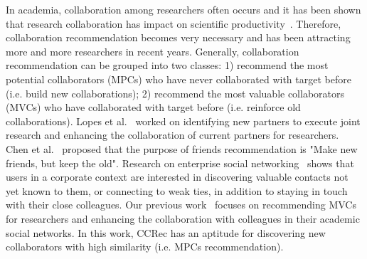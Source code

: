 \documentclass[10pt,letterpaper]{article}
\begin{document}
In academia, collaboration among researchers often occurs and it has been shown that research collaboration has impact on scientific productivity~\cite{lee2005impact}. Therefore, collaboration recommendation becomes very necessary and has been attracting more and more researchers in recent years. Generally, collaboration recommendation can be grouped into two classes: 1) recommend the most potential collaborators (MPCs) who have never collaborated with target before (i.e. build new collaborations); 2) recommend the most valuable collaborators (MVCs) who have collaborated with target before (i.e. reinforce old collaborations). Lopes et al.~\cite{lopes2010collaboration} worked on identifying new partners to execute joint research and enhancing the collaboration of current partners for researchers. Chen et al.~\cite{chen2009make} proposed that the purpose of friends recommendation is "Make new friends, but keep the old". Research on enterprise social networking~\cite{dimicco2008motivations} shows that users in a corporate context are interested in discovering valuable contacts not yet known to them, or connecting to weak ties, in addition to staying in touch with their close colleagues. Our previous work~\cite{li2014acrec,xia2014mvcwalker} focuses on recommending MVCs for researchers and enhancing the collaboration with colleagues in their academic social networks. In this work, CCRec has an aptitude for discovering new collaborators with high similarity (i.e. MPCs recommendation).
\end{document}
